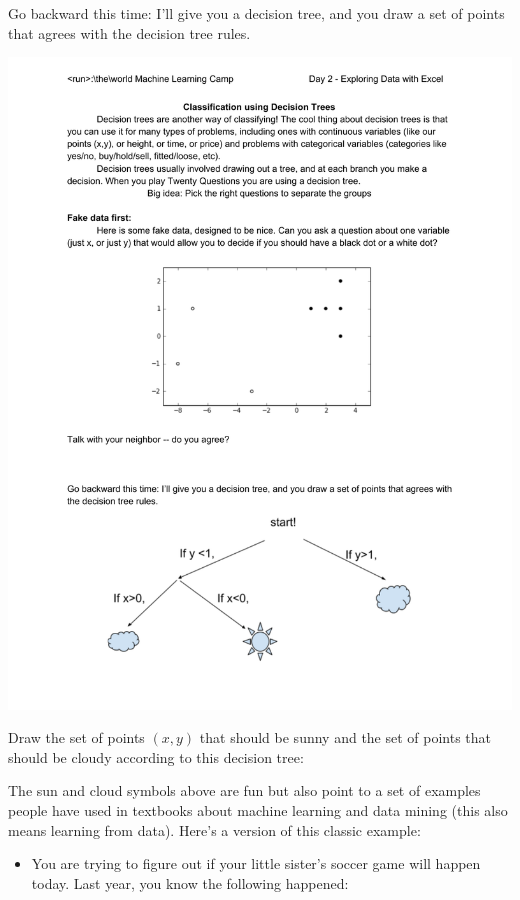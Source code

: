 \documentclass[10pt]{article}
\begin{document}
Go backward this time: I'll give you a decision tree, and you draw a set of points that agrees with the decision tree rules.
\begin{center}
\includegraphics{SunMoonDT.pdf}
\end{center}

Draw the set of points $(x,y)$ that should be sunny and the set of points that should be cloudy according to this decision tree:
\vfill

\pagebreak


The sun and cloud symbols above are fun but also point to a set of examples people have used in textbooks about machine learning and data mining (this also means learning from data). Here's a version of this classic example:
\begin{itemize}
\item[] You are trying to figure out if your little sister's soccer game will happen today. Last year, you know the following happened:
\end{itemize}
\end{document}
